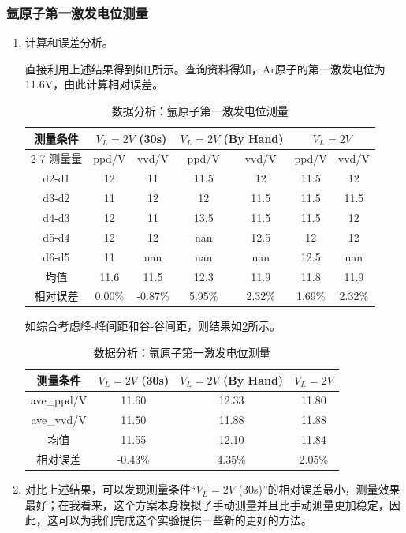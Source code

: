 \documentclass[dvipsnames, svgnames,a4paper,11pt]{article}
\begin{document}
	\subsubsection{氩原子第一激发电位测量}
	\begin{enumerate}
		\item 计算和误差分析。
		
		直接利用上述结果得到如\cref{tab:tab2}所示。查询资料得知，Ar原子的第一激发电位为11.6V，由此计算相对误差。
		
		\begin{table}[htbp]
			\centering
			\caption{数据分析：氩原子第一激发电位测量}
			\label{tab:tab2}
			\begin{tabular}{|c|c|c|c|c|c|c|}
				\hline
				测量条件 & \multicolumn{2}{c|}{$V_L=2V$ (30s)} & \multicolumn{2}{c|}{$V_L=2V$ (By Hand)} & \multicolumn{2}{c|}{$V_L=2V$} \\
				\cline{2-7}
				测量量 & ppd/V & vvd/V & ppd/V & vvd/V & ppd/V & vvd/V \\
				\hline
				d2-d1 & 12 & 11 & 11.5 & 12 & 11.5 & 12 \\
				d3-d2 & 11 & 12 & 12 & 11.5 & 11.5 & 11.5 \\
				d4-d3 & 12 & 11 & 13.5 & 11.5 & 11.5 & 12 \\
				d5-d4 & 12 & 12 & nan & 12.5 & 12 & 12 \\
				d6-d5 & 11 & nan & nan & nan & 12.5 & nan \\
				均值 & 11.6 & 11.5 & 12.3 & 11.9 & 11.8 & 11.9 \\
				相对误差 & 0.00\% & -0.87\% & 5.95\% & 2.32\% & 1.69\% & 2.32\% \\
				\hline
			\end{tabular}
		\end{table}
		
		如综合考虑峰-峰间距和谷-谷间距，则结果如\cref{tab:tab3}所示。
		
		\begin{table}[htbp]
			\centering
			\caption{数据分析：氩原子第一激发电位测量}
			\label{tab:tab3}
			\begin{tabular}{|c|c|c|c|}
				\hline
				测量条件 & $V_L=2V$ (30s) & $V_L=2V$ (By Hand) & $V_L=2V$ \\
				\hline
				ave\_ppd/V & 11.60 & 12.33 & 11.80 \\
				ave\_vvd/V & 11.50 & 11.88 & 11.88 \\
				均值 & 11.55 & 12.10 & 11.84 \\
				相对误差 & -0.43\% & 4.35\% & 2.05\% \\
				\hline
			\end{tabular}
		\end{table}				
		
		\item 对比上述结果，可以发现测量条件“$V_L=2V$ (30s)”的相对误差最小，测量效果最好；在我看来，这个方案本身模拟了手动测量并且比手动测量更加稳定，因此，这可以为我们完成这个实验提供一些新的更好的方法。
	\end{enumerate}
	
\end{document}
